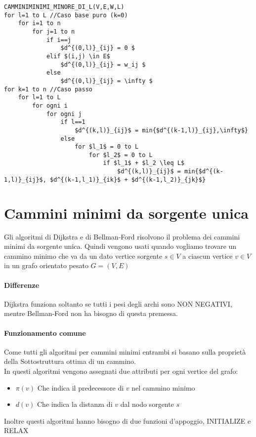 \begin{lstlisting}
CAMMINIMINIMI_MINORE_DI_L(V,E,W,L)
for l=1 to L //Caso base puro (k=0)
    for i=1 to n
        for j=1 to n
            if i==j
                $d^{(0,l)}_{ij} = 0 $
            elif $(i,j) \in E$
                $d^{(0,l)}_{ij} = w_ij $
            else
                $d^{(0,l)}_{ij} = \infty $
for k=1 to n //Caso passo
    for l=1 to L
        for ogni i
            for ogni j
                if l==1
                    $d^{(k,l)}_{ij}$ = min{$d^{(k-1,l)}_{ij},\infty$} 
                else
                    for $l_1$ = 0 to L
                        for $l_2$ = 0 to L
                            if $l_1$ + $l_2 \leq L$
                                $d^{(k,l)}_{ij}$ = min{$d^{(k-1,l)}_{ij}$, $d^{(k-1,l_1)}_{ik}$ + $d^{(k-1,l_2)}_{jk}$} 
\end{lstlisting}

\section{Cammini minimi da sorgente unica}
Gli algoritmi di Dijkstra e di Bellman-Ford risolvono il problema dei cammini minimi da sorgente unica.
Quindi vengono usati quando vogliamo trovare un cammino minimo che va da un dato vertice sorgente $s \in V$ a
ciascun vertice $v \in V$ in un grafo orientato pesato $G = (V, E)$

\paragraph{Differenze}
Dijkstra funziona soltanto se tutti i pesi degli archi sono NON NEGATIVI, mentre
Bellman-Ford non ha bisogno di questa premessa.

\paragraph{Funzionamento comune}
Come tutti gli algoritmi per cammini minimi entrambi si basano sulla
proprietà della Sottostruttura ottima di un cammino.\\
In questi algoritmi vengono assegnati due attributi per ogni vertice del grafo:
\begin{itemize}
	\item $\pi(v)$ Che indica il predecessore di $v$ nel cammino minimo
	\item $d(v)$ Che indica la distanza di $v$ dal nodo sorgente $s$
\end{itemize}

Inoltre questi algoritmi hanno bisogno di due funzioni d'appoggio, INITIALIZE e RELAX

